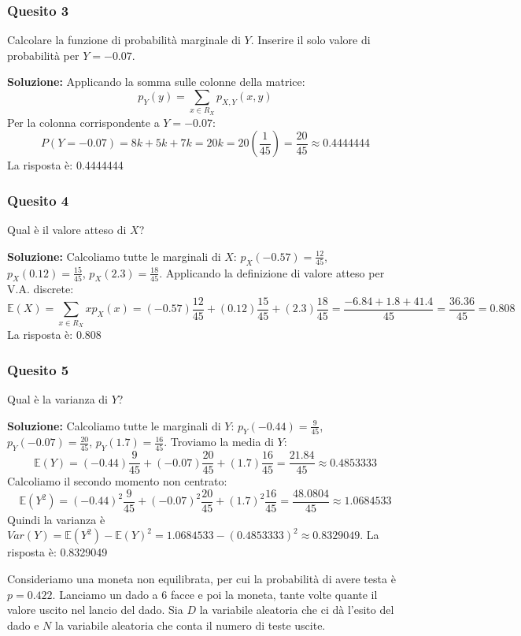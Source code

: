 \documentclass[12pt, a4paper]{article}
\begin{document}
\newpage

\subsubsection*{Quesito 3}
Calcolare la funzione di probabilità marginale di $Y$. Inserire il solo valore di probabilità per $Y=-0.07$.

\textbf{Soluzione:}
Applicando la somma sulle colonne della matrice:
$$ p_Y(y) = \sum_{x \in R_X} p_{X,Y}(x,y) $$
Per la colonna corrispondente a $Y=-0.07$:
$$ P(Y=-0.07) = 8k + 5k + 7k = 20k = 20 \left(\frac{1}{45}\right) = \frac{20}{45} \approx 0.4444444 $$
La risposta è: 0.4444444

\subsubsection*{Quesito 4}
Qual è il valore atteso di $X$?

\textbf{Soluzione:}
Calcoliamo tutte le marginali di $X$: $p_X(-0.57)=\frac{12}{45}$, $p_X(0.12)=\frac{15}{45}$, $p_X(2.3)=\frac{18}{45}$.
Applicando la definizione di valore atteso per V.A. discrete:
$$ \mathbb{E}(X) = \sum_{x \in R_X} x p_X(x) = (-0.57)\frac{12}{45} + (0.12)\frac{15}{45} + (2.3)\frac{18}{45} = \frac{-6.84 + 1.8 + 41.4}{45} = \frac{36.36}{45} = 0.808 $$
La risposta è: 0.808

\subsubsection*{Quesito 5}
Qual è la varianza di $Y$?

\textbf{Soluzione:}
Calcoliamo tutte le marginali di $Y$: $p_Y(-0.44)=\frac{9}{45}$, $p_Y(-0.07)=\frac{20}{45}$, $p_Y(1.7)=\frac{16}{45}$.
Troviamo la media di $Y$:
$$ \mathbb{E}(Y) = (-0.44)\frac{9}{45} + (-0.07)\frac{20}{45} + (1.7)\frac{16}{45} = \frac{21.84}{45} \approx 0.4853333 $$
Calcoliamo il secondo momento non centrato:
$$ \mathbb{E}(Y^2) = (-0.44)^2 \frac{9}{45} + (-0.07)^2 \frac{20}{45} + (1.7)^2 \frac{16}{45} = \frac{48.0804}{45} \approx 1.0684533 $$
Quindi la varianza è $Var(Y) = \mathbb{E}(Y^2) - \mathbb{E}(Y)^2 = 1.0684533 - (0.4853333)^2 \approx 0.8329049$.
La risposta è: 0.8329049

\newpage

\vspace{0.5cm}
\begin{tcolorbox}[colback=lightergray!10, colframe=tocsec, title=\textbf{Esercizio 5}]
Consideriamo una moneta non equilibrata, per cui la probabilità di avere testa è $p=0.422$. Lanciamo un dado a 6 facce e poi la moneta, tante volte quante il valore uscito nel lancio del dado. Sia $D$ la variabile aleatoria che ci dà l’esito del dado e $N$ la variabile aleatoria che conta il numero di teste uscite.
\end{tcolorbox}
\end{document}
